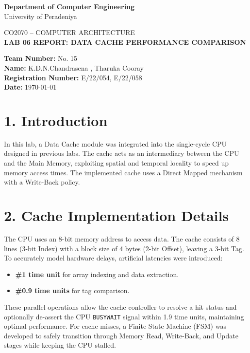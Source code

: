 \documentclass[12pt,a4paper]{article}
\begin{document}
\begin{center}
{\Large \textbf{Department of Computer Engineering}}\\
\vspace{0.2cm}
{\large University of Peradeniya}\\
\vspace{0.6cm}

{\large CO2070 -- COMPUTER ARCHITECTURE}\\
\vspace{0.3cm}
{\Large \textbf{LAB 06 REPORT: DATA CACHE PERFORMANCE COMPARISON}}\\
\vspace{0.2cm}

\end{center}
{\large
\textbf{Team Number:} No. 15\\[0.3cm]
\textbf{Name:} K.D.N.Chandrasena , Tharuka Cooray\\[0.3cm]
\textbf{Registration Number:} E/22/054, E/22/058\\[0.3cm]
\textbf{Date:} \today
}

\vspace{1cm}

\section*{1. Introduction}
In this lab, a Data Cache module was integrated into the single-cycle CPU designed in previous labs. The cache acts as an intermediary between the CPU and the Main Memory, exploiting spatial and temporal locality to speed up memory access times. The implemented cache uses a Direct Mapped mechanism with a Write-Back policy. 

\section*{2. Cache Implementation Details}
The CPU uses an 8-bit memory address to access data. The cache consists of 8 lines (3-bit Index) with a block size of 4 bytes (2-bit Offset), leaving a 3-bit Tag.
To accurately model hardware delays, artificial latencies were introduced:
\begin{itemize}
    \item \textbf{\#1 time unit} for array indexing and data extraction.
    \item \textbf{\#0.9 time units} for tag comparison.
\end{itemize}
These parallel operations allow the cache controller to resolve a hit status and optionally de-assert the CPU \texttt{BUSYWAIT} signal within 1.9 time units, maintaining optimal performance.
For cache misses, a Finite State Machine (FSM) was developed to safely transition through Memory Read, Write-Back, and Update stages while keeping the CPU stalled.
\end{document}
